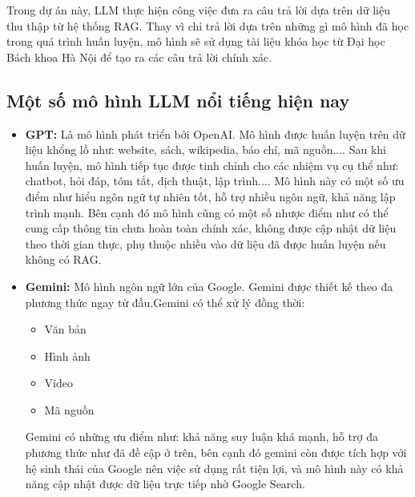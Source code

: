\documentclass[../DoAn.tex]{subfiles}
\begin{document}
Trong dự án này, LLM thực hiện công việc đưa ra câu trả lời dựa trên dữ liệu thu thập từ hệ thống RAG. Thay vì chỉ trả lời dựa trên những gì mô hình đã học trong quá trình huấn luyện, mô hình sẽ sử dụng tài liệu khóa học từ Đại học Bách khoa Hà Nội để tạo ra các câu trả lời chính xác.

\subsection{Một số mô hình LLM nổi tiếng hiện nay}
\begin{itemize}[label=-, leftmargin=*]
    \item \textbf{GPT:} Là mô hình phát triển bởi OpenAI. Mô hình được huấn luyện trên dữ liệu khổng lồ như: website, sách, wikipedia, báo chí, mã nguồn.... Sau khi huấn luyện, mô hình tiếp tục được tinh chỉnh cho các nhiệm vụ cụ thể như: chatbot, hỏi đáp, tóm tắt, dịch thuật, lập trình.... Mô hình này có một số ưu điểm như hiểu ngôn ngữ tự nhiên tốt, hỗ trợ nhiều ngôn ngữ, khả năng lập trình mạnh. Bên cạnh đó mô hình cũng có một số nhược điểm như có thể cung cấp thông tin chưa hoàn toàn chính xác, không được cập nhật dữ liệu theo thời gian thực, phụ thuộc nhiều vào dữ liệu đã được huấn luyện nếu không có RAG.
    \item \textbf{Gemini:} Mô hình ngôn ngữ lớn của Google. Gemini được thiết kế theo đa phương thức ngay từ đầu.Gemini có thể xử lý đồng thời:
          \begin{itemize}[label=+]
              \item Văn bản
              \item Hình ảnh
              \item Video
              \item Mã nguồn
          \end{itemize}
          Gemini có những ưu điểm như: khả năng suy luận khá mạnh, hỗ trợ đa phương thức như đã đề cập ở trên, bên cạnh đó gemini còn được tích hợp với hệ sinh thái của Google nên việc sử dụng rất tiện lợi, và mô hình này có khả năng cập nhật được dữ liệu trực tiếp nhờ Google Search.


\end{itemize}
\end{document}
